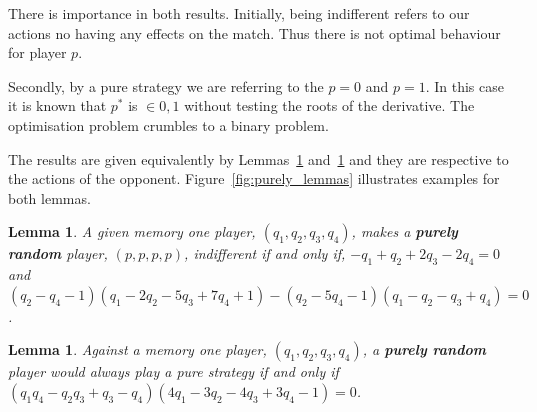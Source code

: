 \documentclass[10pt]{article}
\newtheorem{lemma}[theorem]{Lemma}
\begin{document}
There is importance in both results. Initially, being indifferent refers to our
actions no having any effects on the match. Thus there is not optimal behaviour
for player \(p\). %

Secondly, by a pure strategy we are referring to the \(p=0\) and \(p=1\).
In this case it is known that \(p^*\) is \(\in {0, 1}\) without testing the roots
of the derivative. The optimisation problem crumbles to a binary problem.

The results are given equivalently by Lemmas~\ref{lemma:constant} and~\ref{lemma:linear}
and they are respective to the actions of the opponent. Figure~\ref{fig:purely_lemmas}
illustrates examples for both lemmas.

\begin{lemma}\label{lemma:constant}
    A given memory one player, \((q_1, q_2, q_3, q_4)\), makes a \textbf{purely
    random} player, \((p, p, p, p)\), indifferent if and only if,
    \(-q_1 + q_2 + 2q_3 - 2q_4 = 0 \) and
    \((q_2 - q_4 - 1)(q_1 - 2q_2 - 5q_3 + 7q_4 + 1) -(q_2 - 5q_4 - 1)(q_1 - q_2 - q_3 + q_4) = 0 \).
\end{lemma}

\begin{lemma}\label{lemma:linear}
    Against a memory one player, \((q_1, q_2, q_3, q_4)\), a \textbf{purely random}
    player would always play a pure strategy if and only if
    \((q_{1}q_{4} - q_{2} q_{3} + q_{3} - q_{4}) (4 q_{1} - 3 q_{2} - 4 q_{3} + 3
    q_{4} - 1) = 0\).
\end{lemma}
\end{document}
